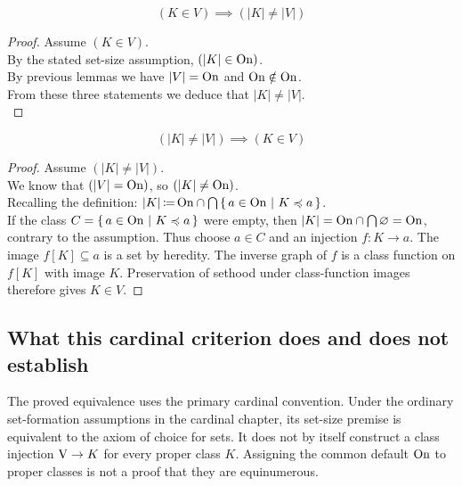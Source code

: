 \begin{lemma}
\label{lem:limitation_of_size_first_part}
\[
(K \in V) \implies (|K| \neq |V|)
\]
\end{lemma}
\begin{proof}
Assume $(K \in V)$.\\
By the stated set-size assumption, $(|K| \in \mathrm{On})$.\\
By previous lemmas we have $|V|=\mathrm{On}$ and $\mathrm{On}\notin\mathrm{On}$.\\
From these three statements we deduce that $|K| \neq |V|$.\\
\end{proof}

\begin{lemma}
\label{lem:limitation_of_size_second_part}
\[
(|K| \neq |V|) \implies (K \in V)
\]
\end{lemma}
\begin{proof}
Assume $(|K| \neq |V|)$.\\
We know that $(|V|=\mathrm{On})$, so $(|K| \neq \mathrm{On})$.\\
Recalling the definition:
$|K|\,{\coloneqq}\, \mathrm{On} \cap \bigcap \left\{\,a\in\mathrm{On}\ \middle|\ K\preccurlyeq a\,\right\}$.\\
If the class $C=\left\{\,a\in\mathrm{On}\ \middle|\ K\preccurlyeq a\,\right\}$ were empty, then
$|K|=\mathrm{On}\cap\bigcap\varnothing=\mathrm{On}$, contrary to the assumption.
Thus choose $a\in C$ and an injection $f:K\to a$.
The image $f[K]\subseteq a$ is a set by heredity. The inverse graph of $f$
is a class function on $f[K]$ with image $K$. Preservation of sethood under
class-function images therefore gives $K\in V$.
\end{proof}

\subsection{What this cardinal criterion does and does not establish}
The proved equivalence uses the primary cardinal convention. Under the
ordinary set-formation assumptions in the cardinal chapter, its set-size
premise is equivalent to the axiom of choice for sets. It does not by
itself construct a class injection $\mathrm{V}\to K$ for every proper class $K$.
Assigning the common default $\mathrm{On}$ to proper classes is not a proof that
they are equinumerous.

